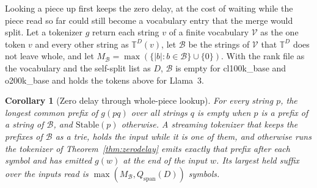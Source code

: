 \documentclass[11pt,a4paper]{article}
\theoremstyle{definition}
\theoremstyle{plain}
\newtheorem{corollary}{Corollary}
\newcommand{\T}{\mathbb{T}}
\newcommand{\Stable}{\mathrm{Stable}}
\begin{document}
Looking a piece up first keeps the zero delay, at the cost of waiting while the piece read so far could still become a
vocabulary entry that the merge would split. Let a tokenizer \(g\) return each string \(v\) of a finite vocabulary
\(\mathcal{V}\) as the one token \(v\) and every other string as \(\T^D(v)\), let \(\mathcal{B}\) be the strings of
\(\mathcal{V}\) that \(\T^D\) does not leave whole, and let
\(M_{\mathcal{B}} = \max(\{|b| : b \in \mathcal{B}\} \cup \{0\})\). With the rank file as the vocabulary and the
self-split list as \(D\), \(\mathcal{B}\) is empty for cl100k\_base and o200k\_base and holds the \LlamaNotWhole{}
tokens above for Llama~3.


\begin{corollary}[Zero delay through whole-piece lookup]\label{cor:wholepiece}
For every string \(p\), the longest common prefix of \(g(pq)\) over all strings \(q\) is empty when \(p\) is a prefix of
a string of \(\mathcal{B}\), and \(\Stable(p)\) otherwise. A streaming tokenizer that keeps the prefixes of
\(\mathcal{B}\) as a trie, holds the input while it is one of them, and otherwise runs the tokenizer of
Theorem~\ref{thm:zerodelay} emits exactly that prefix after each symbol and has emitted \(g(w)\) at the end of the input
\(w\). Its largest held suffix over the inputs read is \(\max(M_{\mathcal{B}}, Q_{\mathrm{span}}(D))\) symbols.
\end{corollary}
\end{document}
